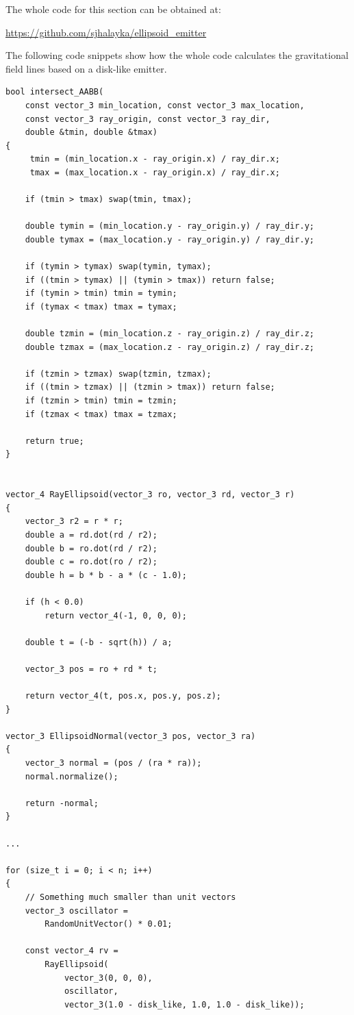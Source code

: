 \documentclass[12pt]{article}
\begin{document}
The whole code for this section can be obtained at:

\url{https://github.com/sjhalayka/ellipsoid_emitter}




The following code snippets show how the whole code calculates the gravitational field lines based on a disk-like emitter.
\begin{lstlisting}
bool intersect_AABB(
	const vector_3 min_location, const vector_3 max_location, 
	const vector_3 ray_origin, const vector_3 ray_dir,
	double &tmin, double &tmax)
{
	 tmin = (min_location.x - ray_origin.x) / ray_dir.x;
	 tmax = (max_location.x - ray_origin.x) / ray_dir.x;

	if (tmin > tmax) swap(tmin, tmax);

	double tymin = (min_location.y - ray_origin.y) / ray_dir.y;
	double tymax = (max_location.y - ray_origin.y) / ray_dir.y;

	if (tymin > tymax) swap(tymin, tymax);
	if ((tmin > tymax) || (tymin > tmax)) return false;
	if (tymin > tmin) tmin = tymin;
	if (tymax < tmax) tmax = tymax;

	double tzmin = (min_location.z - ray_origin.z) / ray_dir.z;
	double tzmax = (max_location.z - ray_origin.z) / ray_dir.z;

	if (tzmin > tzmax) swap(tzmin, tzmax);
	if ((tmin > tzmax) || (tzmin > tmax)) return false;
	if (tzmin > tmin) tmin = tzmin;
	if (tzmax < tmax) tmax = tzmax;

	return true;
}


vector_4 RayEllipsoid(vector_3 ro, vector_3 rd, vector_3 r)
{
	vector_3 r2 = r * r;
	double a = rd.dot(rd / r2);
	double b = ro.dot(rd / r2);
	double c = ro.dot(ro / r2);
	double h = b * b - a * (c - 1.0);

	if (h < 0.0)
		return vector_4(-1, 0, 0, 0);

	double t = (-b - sqrt(h)) / a;

	vector_3 pos = ro + rd * t;

	return vector_4(t, pos.x, pos.y, pos.z);
}

vector_3 EllipsoidNormal(vector_3 pos, vector_3 ra)
{
	vector_3 normal = (pos / (ra * ra));
	normal.normalize();

	return -normal;
}

...

for (size_t i = 0; i < n; i++)
{
	// Something much smaller than unit vectors
	vector_3 oscillator = 
		RandomUnitVector() * 0.01; 

	const vector_4 rv = 
		RayEllipsoid(
			vector_3(0, 0, 0), 
			oscillator, 
			vector_3(1.0 - disk_like, 1.0, 1.0 - disk_like));


\end{lstlisting}
\end{document}
